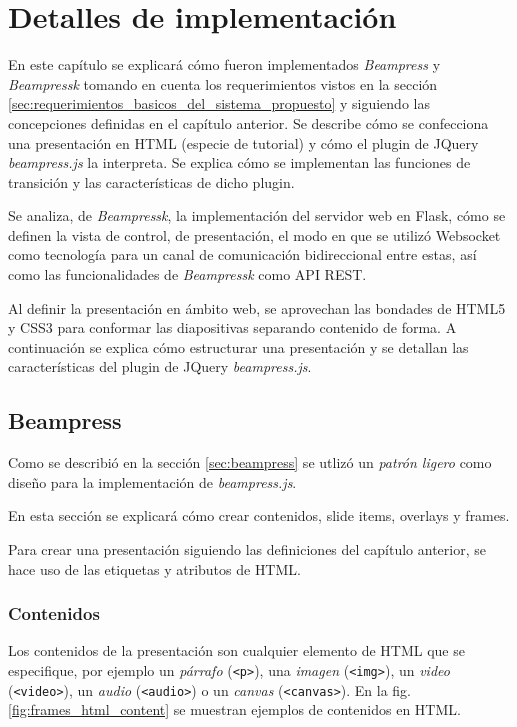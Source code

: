 \chapter{Detalles de implementación} %
\label{cha:detalles_de_implementacion}
	En este capítulo se explicará cómo fueron implementados \textit{Beampress} y \textit{Beampressk} tomando en cuenta los requerimientos vistos en la sección \ref{sec:requerimientos_basicos_del_sistema_propuesto} y siguiendo las concepciones definidas en el capítulo anterior. Se describe cómo se confecciona una presentación en HTML (especie de tutorial) y cómo el plugin de JQuery \textit{beampress.js} la interpreta. Se explica cómo se implementan las funciones de transición y las características de dicho plugin.

	Se analiza, de \textit{Beampressk}, la implementación del servidor web en Flask, cómo se definen la vista de control, de presentación, el modo en que se utilizó Websocket como tecnología para un canal de comunicación bidireccional entre estas, así como las funcionalidades de \textit{Beampressk} como API REST.

	Al definir la presentación en ámbito web, se aprovechan las bondades de HTML5 y CSS3 para conformar las diapositivas separando contenido de forma. A continuación se explica cómo estructurar una presentación y se detallan las características del plugin de JQuery \textit{beampress.js}. 

	\section{Beampress} %
	\label{sec:beampress_imp}
	

		Como se describió en la sección \ref{sec:beampress} se utlizó un  \textit{patrón ligero} como diseño para la implementación de \textit{beampress.js}. 

		En esta sección se explicará cómo crear contenidos, slide items, overlays y frames.

		Para crear una presentación siguiendo las definiciones del capítulo anterior, se hace uso de las etiquetas y atributos de HTML.


		\subsection{Contenidos} %
		\label{sub:contenidos}
			Los contenidos de la presentación son cualquier elemento de HTML que se especifique, por ejemplo un \textit{párrafo} (\texttt{<p>}), una \textit{imagen} (\texttt{<img>}), un \textit{video} (\texttt{<video>}), un \textit{audio} (\texttt{<audio>}) o un \textit{canvas} (\texttt{<canvas>}). En la fig. \ref{fig:frames_html_content} se muestran ejemplos de contenidos en HTML.

